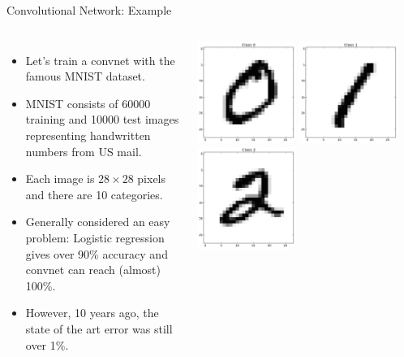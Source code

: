 \documentclass[10pt, aspectratio=169]{beamer} %
\begin{document}
\begin{frame}[fragile]{Convolutional Network: Example}
\begin{columns}
\begin{itemize}
	\item Let's train a convnet with the famous MNIST dataset.
	\item MNIST consists of 60000 training and 10000 test images
	representing handwritten numbers from US mail.
	\item Each image is $28\times 28$ pixels and there are 10 categories.
	\item Generally considered an easy problem: Logistic regression
	gives over 90\% accuracy and convnet can reach (almost) 100\%.
	\item However, 10 years ago, the state of the art error was still over 1\%.
\end{itemize}
\includegraphics[width=0.45\textwidth]{mnist_0.png}
\includegraphics[width=0.45\textwidth]{mnist_1.png}\\
\includegraphics[width=0.45\textwidth]{mnist_2.png}

\end{columns}
\end{frame}
\end{document}
